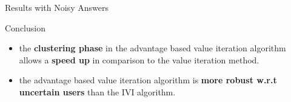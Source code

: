 \documentclass{beamer}
\newcommand{\remark}[1]{{\color{blue}{#1}}}
\begin{document}
\begin{frame}[plain]{Results with Noisy Answers}


\end{frame}

\begin{frame}{Conclusion}

\remark{ Advantage based Value Iteration}
\begin{itemize}
\item the \textbf{clustering phase} in the advantage based value iteration algorithm allows a \textbf{speed up} in comparison to the value iteration method.
\item the advantage based value iteration algorithm is \textbf{more robust w.r.t uncertain users} than the IVI algorithm.
\end{itemize}

\end{frame}
\end{document}
